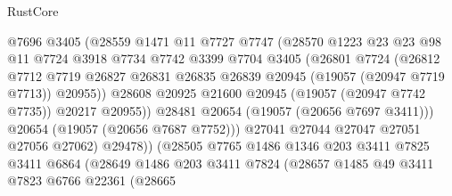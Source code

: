 \begin{lexlean}{RustCore}
\begin{coremodule}
                            @7696
                            @3405
                            (@28559
                              @1471
                              @11
                              @7727
                              @7747
                              (@28570
                                @1223
                                @23
                                @23
                                @98
                                @11
                                @7724
                                @3918
                                @7734
                                @7742
                                @3399
                                @7704
                                @3405
                                (@26801
                                  @7724
                                  (@26812
                                    @7712
                                    @7719
                                    @26827
                                    @26831
                                    @26835
                                    @26839
                                    @20945
                                    (@19057 (@20947 @7719 @7713))
                                    @20955))
                                @28608
                                @20925
                                @21600
                                @20945
                                (@19057 (@20947 @7742 @7735))
                                @20217
                                @20955))
                            @28481
                            @20654
                            (@19057 (@20656 @7697 @3411)))
                          @20654
                          (@19057 (@20656 @7687 @7752)))
                        @27041
                        @27044
                        @27047
                        @27051
                        @27056
                        @27062)
                      @29478))
                  (@28505
                    @7765
                    @1486
                    @1346
                    @203
                    @3411
                    @7825
                    @3411
                    @6864
                    (@28649
                      @1486
                      @203
                      @3411
                      @7824
                      (@28657
                        @1485
                        @49
                        @3411
                        @7823
                        @6766
                        @22361
                        (@28665

\end{coremodule}
\end{lexlean}
